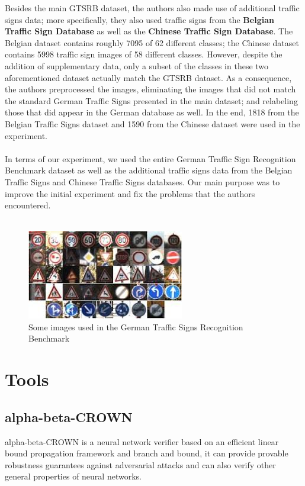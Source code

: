 \documentclass[12pt,a4paper]{report}
\newcommand\tab[1][5mm]{\hspace*{#1}}
\begin{document}
Besides the main GTSRB dataset, the authors also made use of additional traffic signs data; more specifically, they also used traffic signs from the \textbf{Belgian Traffic Sign Database} as well as the \textbf{Chinese Traffic Sign Database}. The Belgian dataset contains roughly 7095 of 62 different classes; the Chinese dataset contains 5998 traffic sign images of 58 different classes. However, despite the addition of supplementary data, only a subset of the classes in these two aforementioned dataset actually match the GTSRB dataset. As a consequence, the authors preprocessed the images, eliminating the images that did not match the standard German Traffic Signs presented in the main dataset; and relabeling those that did appear in the German database as well. In the end, 1818 from the Belgian Traffic Signs dataset and 1590 from the Chinese dataset were used in the experiment.\\\\
In terms of our experiment, we used the entire German Traffic Sign Recognition Benchmark dataset as well as the additional traffic signs data from the Belgian Traffic Signs and Chinese Traffic Signs databases. Our main purpose was to improve the initial experiment and fix the problems that the authors encountered. \\\\

\begin{figure}[h]
\centering
\includegraphics[scale=0.8]{figure2.jpg}
\caption{Some images used in the German Traffic Signs Recognition Benchmark}
\end{figure}

\chapter{Tools}
\section{alpha-beta-CROWN}
\tab alpha-beta-CROWN is a neural network verifier based on an efficient linear bound propagation framework and branch and bound, it can provide provable robustness guarantees against adversarial attacks and can also verify other general properties of neural networks\cite{alpha-beta-crown-git}.
\end{document}
